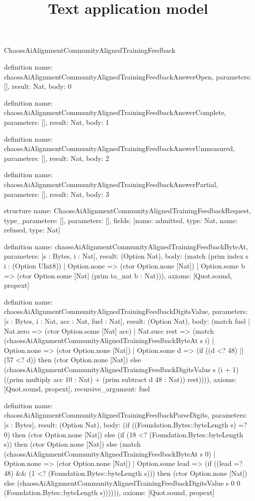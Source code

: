 \begin{lexlean}{ChaossAiAlignmentCommunityAlignedTrainingFeedback}
\title{Text application model}
\begin{semanticmodule}
definition{
  name: chaossAiAlignmentCommunityAlignedTrainingFeedbackAnswerOpen,
  parameters: [],
  result: Nat,
  body: 0
}

definition{
  name: chaossAiAlignmentCommunityAlignedTrainingFeedbackAnswerComplete,
  parameters: [],
  result: Nat,
  body: 1
}

definition{
  name: chaossAiAlignmentCommunityAlignedTrainingFeedbackAnswerUnmeasured,
  parameters: [],
  result: Nat,
  body: 2
}

definition{
  name: chaossAiAlignmentCommunityAlignedTrainingFeedbackAnswerPartial,
  parameters: [],
  result: Nat,
  body: 3
}

structure{
  name: ChaossAiAlignmentCommunityAlignedTrainingFeedbackRequest,
  type_parameters: [],
  parameters: [],
  fields: [{name: admitted, type: Nat}, {name: refused, type: Nat}]
}

definition{
  name: chaossAiAlignmentCommunityAlignedTrainingFeedbackByteAt,
  parameters: [s : Bytes, i : Nat],
  result: (Option Nat),
  body: (match (prim index s i : (Option UInt8))
    | Option.none => (ctor Option.none [Nat])
    | Option.some b => (ctor Option.some [Nat] (prim to_nat b : Nat))),
  axioms: [Quot.sound, propext]
}

definition{
  name: chaossAiAlignmentCommunityAlignedTrainingFeedbackDigitsValue,
  parameters: [s : Bytes, i : Nat, acc : Nat, fuel : Nat],
  result: (Option Nat),
  body: (match fuel
    | Nat.zero => (ctor Option.some [Nat] acc)
    | Nat.succ rest => (match (chaossAiAlignmentCommunityAlignedTrainingFeedbackByteAt s i)
      | Option.none => (ctor Option.none [Nat])
      | Option.some d => (if ((d <? 48) || (57 <? d)) then (ctor Option.none [Nat]) else (chaossAiAlignmentCommunityAlignedTrainingFeedbackDigitsValue s (i + 1) ((prim multiply acc 10 : Nat) + (prim subtract d 48 : Nat)) rest)))),
  axioms: [Quot.sound, propext],
  recursive_argument: fuel
}

definition{
  name: chaossAiAlignmentCommunityAlignedTrainingFeedbackParseDigits,
  parameters: [s : Bytes],
  result: (Option Nat),
  body: (if ((Foundation.Bytes::byteLength s) =? 0) then (ctor Option.none [Nat]) else (if (18 <? (Foundation.Bytes::byteLength s)) then (ctor Option.none [Nat]) else (match (chaossAiAlignmentCommunityAlignedTrainingFeedbackByteAt s 0)
    | Option.none => (ctor Option.none [Nat])
    | Option.some lead => (if ((lead =? 48) && (1 <? (Foundation.Bytes::byteLength s))) then (ctor Option.none [Nat]) else (chaossAiAlignmentCommunityAlignedTrainingFeedbackDigitsValue s 0 0 (Foundation.Bytes::byteLength s)))))),
  axioms: [Quot.sound, propext]
}


\end{semanticmodule}
\end{lexlean}

